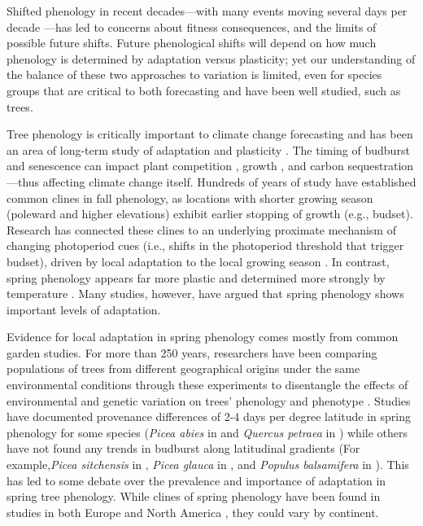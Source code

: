 \documentclass{article}
\begin{document}
Shifted phenology in recent decades---with many events moving several days per decade \citep{vita21,khar18,Menzel06}---has led to concerns about fitness consequences, and the limits of possible future shifts. Future phenological shifts will depend on how much phenology is determined by adaptation versus plasticity; yet our understanding of the balance of these two approaches to variation is limited, even for species groups that are critical to both forecasting and have been well studied, such as trees. 

Tree phenology is critically important to climate change forecasting and has been an area of long-term study of adaptation and plasticity \citep{Cleland:2007or}. The timing of budburst and senescence can impact plant competition \citep{fridley12}, growth \citep{myneni97}, and carbon sequestration \citep{Barichivich12}---thus affecting climate change itself. Hundreds of years of study have established common clines in fall phenology, as locations with shorter growing season (poleward and higher elevations) exhibit earlier stopping of growth (e.g., budset). Research has connected these clines to an underlying proximate mechanism of changing photoperiod cues (i.e., shifts in the photoperiod threshold that trigger budset), driven by local adaptation to the local growing season \citep{Alberto13,Savolainen07}. In contrast, spring phenology appears far more plastic \citep{AitkenBemmels16} and determined more strongly by temperature \citep{flynn18}. Many studies, however, have argued that spring phenology shows important levels of adaptation. 

Evidence for local adaptation in spring phenology comes mostly from common garden studies. For more than 250 years, researchers have been comparing populations of trees from different geographical origins under the same environmental conditions through these experiments to disentangle the effects of environmental and genetic variation on trees’ phenology and phenotype \citep{AitkenBemmels16, Alberto13}. Studies have documented provenance differences of 2-4 days per degree latitude in spring phenology for some species (\emph{Picea abies} in \citealp{sog08} and \emph{Quercus petraea} in \citealp{deans96}) while others have not found any trends in budburst along latitudinal gradients (For example,\emph{Picea sitchensis} in \citealp{mimura07}, \emph{Picea glauca} in \citealp{Li97}, and \emph{Populus balsamifera} in \citealp{farmer93}). This has led to some debate over the prevalence and importance of adaptation in spring tree phenology. While clines of spring phenology have been found in studies in both Europe \citep{sog08,deans96,von95} and North America \citep{rossi15, soo13, hannerz99}, they could vary by continent. 
\end{document}
